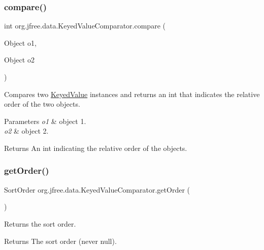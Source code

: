 \subsubsection{\texorpdfstring{compare()}{compare()}}
{\footnotesize\ttfamily int org.\+jfree.\+data.\+Keyed\+Value\+Comparator.\+compare (\begin{DoxyParamCaption}\item[{Object}]{o1,  }\item[{Object}]{o2 }\end{DoxyParamCaption})}

Compares two \mbox{\hyperlink{interfaceorg_1_1jfree_1_1data_1_1_keyed_value}{Keyed\+Value}} instances and returns an {\ttfamily int} that indicates the relative order of the two objects.


\begin{DoxyParams}{Parameters}
{\em o1} & object 1. \\
\hline
{\em o2} & object 2.\\
\hline
\end{DoxyParams}
\begin{DoxyReturn}{Returns}
An int indicating the relative order of the objects. 
\end{DoxyReturn}
\mbox{\label{classorg_1_1jfree_1_1data_1_1_keyed_value_comparator_a617b15fed2cc0f6ec2b3c0b921d5e79b}} 
\subsubsection{\texorpdfstring{get\+Order()}{getOrder()}}
{\footnotesize\ttfamily Sort\+Order org.\+jfree.\+data.\+Keyed\+Value\+Comparator.\+get\+Order (\begin{DoxyParamCaption}{ }\end{DoxyParamCaption})}

Returns the sort order.

\begin{DoxyReturn}{Returns}
The sort order (never {\ttfamily null}). 
\end{DoxyReturn}
\mbox{\label{classorg_1_1jfree_1_1data_1_1_keyed_value_comparator_ab94fe2f9f46ccfd543fc6a0fb9b6632f}} 
